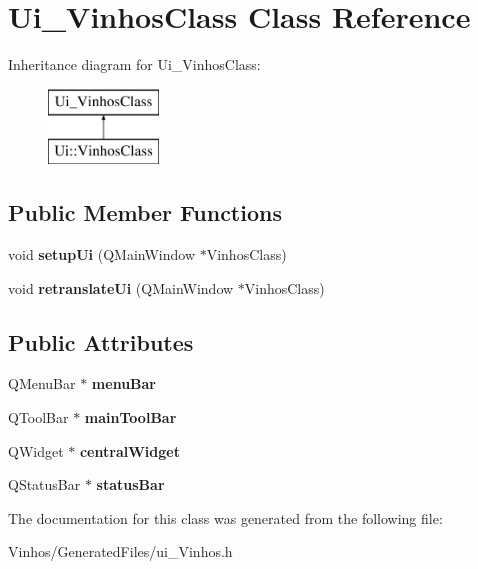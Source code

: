 \hypertarget{class_ui___vinhos_class}{}\section{Ui\+\_\+\+Vinhos\+Class Class Reference}
\label{class_ui___vinhos_class}
Inheritance diagram for Ui\+\_\+\+Vinhos\+Class\+:\begin{figure}[H]
\begin{center}
\leavevmode
\includegraphics[height=2.000000cm]{class_ui___vinhos_class}
\end{center}
\end{figure}
\subsection*{Public Member Functions}
\begin{DoxyCompactItemize}
\item 
\mbox{\label{class_ui___vinhos_class_ab30c3a295a5cdddc4e9e5fe022cad3f1}} 
void {\bfseries setup\+Ui} (Q\+Main\+Window $\ast$Vinhos\+Class)
\item 
\mbox{\label{class_ui___vinhos_class_a7d4ff86c37ed4aac53052fc8d3032c0f}} 
void {\bfseries retranslate\+Ui} (Q\+Main\+Window $\ast$Vinhos\+Class)
\end{DoxyCompactItemize}
\subsection*{Public Attributes}
\begin{DoxyCompactItemize}
\item 
\mbox{\label{class_ui___vinhos_class_a095c73e52be913a9815ac8f903403f08}} 
Q\+Menu\+Bar $\ast$ {\bfseries menu\+Bar}
\item 
\mbox{\label{class_ui___vinhos_class_af36d65eb16343fffa006f1b5e83a06e9}} 
Q\+Tool\+Bar $\ast$ {\bfseries main\+Tool\+Bar}
\item 
\mbox{\label{class_ui___vinhos_class_a304fba6c5f17885055d58f21be247429}} 
Q\+Widget $\ast$ {\bfseries central\+Widget}
\item 
\mbox{\label{class_ui___vinhos_class_aa9bde5c3cc3de9a74a1fc3d59abd4414}} 
Q\+Status\+Bar $\ast$ {\bfseries status\+Bar}
\end{DoxyCompactItemize}


The documentation for this class was generated from the following file\+:\begin{DoxyCompactItemize}
\item 
Vinhos/\+Generated\+Files/ui\+\_\+\+Vinhos.\+h\end{DoxyCompactItemize}
